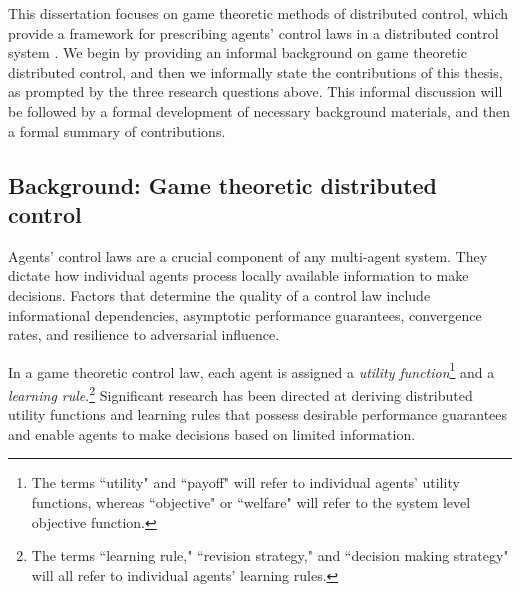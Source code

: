 This dissertation focuses on game theoretic methods of distributed control, which provide a framework for prescribing agents' control laws in a distributed control system \cite{Marden2008, Zhu2009, Goto2010, Staudigl2012, Fox2010, Lasaulce2011, Alpcan2010, Han2012, MacKenzie2006, Menache2011}. We begin by providing an informal background on game theoretic distributed control, and then we informally state the contributions of this thesis, as prompted by the three research questions above. This informal discussion will be followed by a formal development of necessary background materials, and then a formal summary of  contributions. 


\subsection{Background: Game theoretic distributed control}

Agents' control laws are a crucial component of any multi-agent system. They dictate how individual agents process locally available information to make decisions. Factors that determine the quality of a control law include informational dependencies, asymptotic performance guarantees, convergence rates, and resilience to adversarial influence.

In a game theoretic control law, each agent is assigned a {\it utility function}\footnote{The terms ``utility" and ``payoff" will refer to individual agents' utility functions, whereas ``objective" or ``welfare" will refer to the system level objective function.} and a {\it learning rule}.\footnote{The terms ``learning rule," ``revision strategy," and ``decision making strategy" will all refer to individual agents' learning rules.} Significant research has been directed at deriving distributed utility functions and learning rules that possess desirable performance guarantees and enable agents to make decisions based on limited information.



